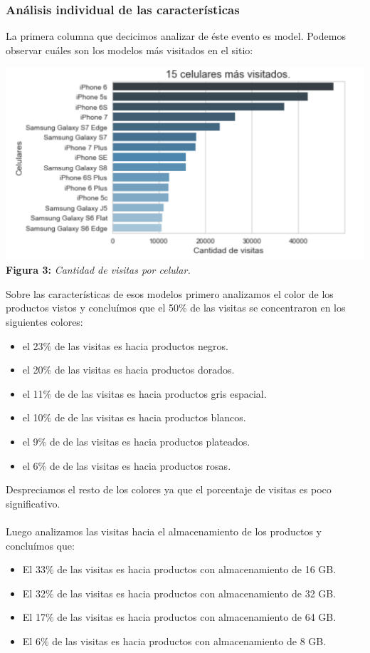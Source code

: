 \documentclass[titlepage,a4paper]{article}
\begin{document}
	\subsubsection{Análisis individual de las características}
	La primera columna que decicimos analizar de éste evento es model. Podemos observar cuáles son los modelos más visitados en el sitio:
	\begin{center}
	\includegraphics[width=15cm]{15celularesMasVisitados.jpg}\\
	\textbf{Figura 3:}  \textit{Cantidad de visitas por celular.}
	\end{center}
	 Sobre las características de esos modelos primero analizamos el color de los productos vistos y concluímos que el 50\% de las visitas se concentraron en los siguientes colores:
	\begin{itemize}
	\item el 23\% de las visitas es hacia productos negros.
	\item el 20\% de las visitas es hacia productos dorados.
	\item el 11\% de de las visitas es hacia productos gris espacial.
    \item el 10\% de de las visitas es hacia productos blancos.
     \item el 9\% de de las visitas es hacia productos plateados.
     \item el 6\% de de las visitas es hacia productos rosas.
	\end{itemize}	   
	Despreciamos el resto de los colores ya que el porcentaje de visitas es poco significativo. \\  \\
	Luego analizamos las visitas hacia el almacenamiento de los productos y concluímos que:
	\begin{itemize}
	\item El 33\% de las visitas es hacia productos con almacenamiento de 16 GB.
    \item El 32\% de las visitas es hacia productos con almacenamiento de 32 GB.
    \item El 17\% de las visitas es hacia productos con almacenamiento de 64 GB.
    \item El 6\% de las visitas es hacia productos con almacenamiento de 8 GB.
	\end{itemize}
\end{document}
